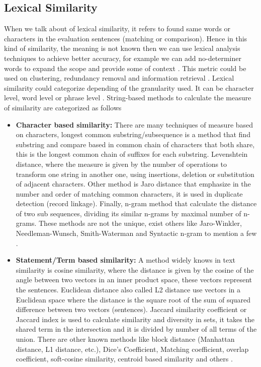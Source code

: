 \documentclass[12pt]{report}
\begin{document}
\subsection{Lexical Similarity}
When we talk about of lexical similarity, it refers to found same words or characters in the evaluation sentences (matching or comparison). Hence in this kind of similarity, the meaning is not known then we can use lexical analysis techniques to achieve better accuracy, for example we can add no-determiner words to expand the scope and provide some of context \cite{Ganesan2015} \cite{Gomaa2013}. This metric could be used on clustering, redundancy removal and information retrieval \cite{Ganesan2015}. Lexical similarity could categorize depending of the granularity used. It can be character level, word level or phrase level \cite{Ganesan2015} \cite{Pradhan2015}. String-based methods to calculate the measure of similarity are categorized as follows

\begin{itemize}[nolistsep]
	\item \textbf{Character based similarity:} There are many techniques of measure based on characters, longest common substring/subsequence is a method that find substring and compare based in common chain of characters that both share, this is the longest common chain of suffixes for each substring. Levenshtein distance, where the measure is given by the number of operations to transform one string in another one, using insertions, deletion or substitution of adjacent characters. Other method is Jaro distance that emphasize in the number and order of matching common characters, it is used in duplicate detection (record linkage). Finally, n-gram method that calculate the distance of two sub sequences, dividing its similar n-grams by maximal number of n-grams. These methods are not the unique, exist others like Jaro-Winkler, Needleman-Wunsch, Smith-Waterman and Syntactic n-gram to mention a few \cite{Gomaa2013} \cite{Majumder2016} \cite{Pradhan2015}.
	\item \textbf{Statement/Term based similarity:} A method widely knows in text similarity is cosine similarity, where the distance is given by the cosine of the angle between two vectors in an inner product space, these vectors represent the sentences. Euclidean distance also called L2 distance use vectors in a Euclidean space where the distance is the square root of the sum of squared difference between two vectors (sentences). Jaccard similarity coefficient or Jaccard index is used to calculate similarity and diversity in sets, it takes the shared term in the intersection and it is divided by number of all terms of the union. There are other known methods like block distance (Manhattan distance, L1 distance, etc.), Dice's Coefficient, Matching coefficient, overlap coefficient, soft-cosine similarity, centroid based similarity and others\cite{Majumder2016} \cite{Pradhan2015} \cite{Gomaa2013} .
\end{itemize}
\end{document}
